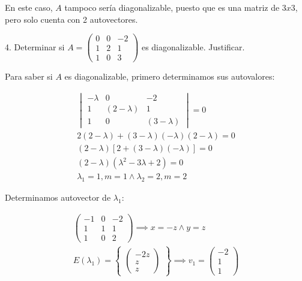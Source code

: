 \documentclass[12pt]{article}
\begin{document}
En este caso,
\(A\) tampoco sería diagonalizable,
puesto que es una matriz de \(3x3\),
pero solo cuenta con 2 autovectores.

\pagebreak

4. Determinar si
\(A = \begin{pmatrix}
	0 & 0 & -2 \\
	1 & 2 & 1  \\
	1 & 0 & 3
\end{pmatrix}\)
es diagonalizable.
Justificar.

Para saber si \(A\) es diagonalizable,
primero determinamos sus autovalores:

\begin{align*}
	\begin{vmatrix}
		-\lambda & 0           & -2          \\
		1        & (2-\lambda) & 1           \\
		1        & 0           & (3-\lambda)
	\end{vmatrix}
	= 0                                                \\
	2(2-\lambda) + (3-\lambda)(-\lambda)(2-\lambda) =0 \\
	(2-\lambda)[2+(3-\lambda)(-\lambda)] =0            \\
	(2-\lambda)(\lambda^{2}-3\lambda+2) = 0            \\
	\boxed{\lambda_{1} = 1, m = 1} \land \boxed{\lambda_{2} = 2, m=2}
\end{align*}

Determinamos autovector de \(\lambda_{1}\):

\begin{align*}
	\begin{pmatrix}
		-1 & 0 & -2 \\1&1&1\\1&0&2
	\end{pmatrix} \implies \boxed{x=-z} \land \boxed{y=z} \\
	E(\lambda_{1})=
	\begin{Bmatrix}
		\begin{pmatrix}
			-2z \\z\\z
		\end{pmatrix}
	\end{Bmatrix}
	\implies
	v_{1} =
	\begin{pmatrix}
		-2 \\1\\1
	\end{pmatrix}
\end{align*}
\end{document}
